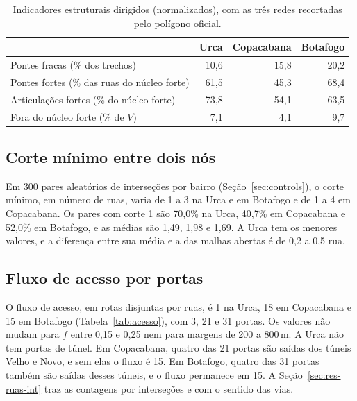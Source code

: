 \begin{table}[t]
\centering
\caption{Indicadores estruturais dirigidos (normalizados), com as três
redes recortadas pelo polígono oficial.}
\label{tab:estrutural}
\begin{tabular}{lrrr}
\toprule
 & Urca & Copacabana & Botafogo \\
\midrule
Pontes fracas (\% dos trechos)          & 10,6 & 15,8 & 20,2 \\
Pontes fortes (\% das ruas do núcleo forte)   & 61,5 & 45,3 & 68,4 \\
Articulações fortes (\% do núcleo forte)      & 73,8 & 54,1 & 63,5 \\
Fora do núcleo forte (\% de $V$)        & 7,1  & 4,1  & 9,7 \\
\bottomrule
\end{tabular}
\end{table}

\subsection{Corte mínimo entre dois nós}
\label{sec:res-mincut}

Em 300 pares aleatórios de interseções por bairro
(Seção~\ref{sec:controls}), o corte mínimo, em número de ruas, varia de
1 a 3 na Urca e em Botafogo e de 1 a 4 em Copacabana. Os pares com corte
1 são 70,0\% na Urca, 40,7\% em Copacabana e 52,0\% em Botafogo, e as
médias são 1,49, 1,98 e 1,69. A Urca tem os menores valores, e a
diferença entre sua média e a das malhas abertas é de 0,2 a 0,5 rua.

\subsection{Fluxo de acesso por portas}
\label{sec:res-access}

O fluxo de acesso, em rotas disjuntas por ruas, é 1 na Urca, 18 em
Copacabana e 15 em Botafogo (Tabela~\ref{tab:acesso}), com 3, 21 e 31
portas. Os valores não mudam para $f$ entre 0,15 e 0,25 nem para
margens de 200 a 800\,m. A Urca não tem portas de túnel. Em Copacabana,
quatro das 21 portas são saídas dos túneis Velho e Novo, e sem elas o
fluxo é 15. Em Botafogo, quatro das 31 portas também são saídas desses
túneis, e o fluxo permanece em 15. A Seção~\ref{sec:res-ruas-int} traz
as contagens por interseções e com o sentido das vias.

